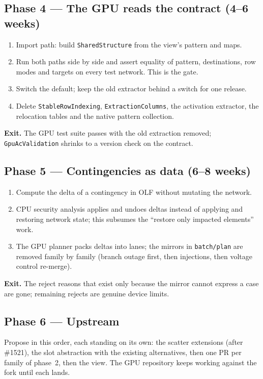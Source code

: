 \documentclass[11pt,a4paper]{article}
\newcommand{\code}[1]{\texttt{\small #1}}
\begin{document}
\subsection*{Phase 4 --- The GPU reads the contract \hfill (4--6 weeks)}
\begin{enumerate}
\item Import path: build \code{SharedStructure} from the view's pattern and maps.
\item Run both paths side by side and assert equality of pattern, destinations, row
      modes and targets on every test network. This is the gate.
\item Switch the default; keep the old extractor behind a switch for one release.
\item Delete \code{StableRowIndexing}, \code{ExtractionColumns}, the activation
      extractor, the relocation tables and the native pattern collection.
\end{enumerate}
\textbf{Exit.} The GPU test suite passes with the old extraction removed;
\code{GpuAcValidation} shrinks to a version check on the contract.

\subsection*{Phase 5 --- Contingencies as data \hfill (6--8 weeks)}
\begin{enumerate}
\item Compute the delta of a contingency in OLF without mutating the network.
\item CPU security analysis applies and undoes deltas instead of applying and restoring
      network state; this subsumes the ``restore only impacted elements'' work.
\item The GPU planner packs deltas into lanes; the mirrors in \code{batch/plan} are
      removed family by family (branch outage first, then injections, then voltage
      control re-merge).
\end{enumerate}
\textbf{Exit.} The reject reasons that exist only because the mirror cannot express a
case are gone; remaining rejects are genuine device limits.

\subsection*{Phase 6 --- Upstream}
Propose in this order, each standing on its own: the scatter extensions (after \#1521),
the slot abstraction with the existing alternatives, then one PR per family of phase~2,
then the view. The GPU repository keeps working against the fork until each lands.
\end{document}
